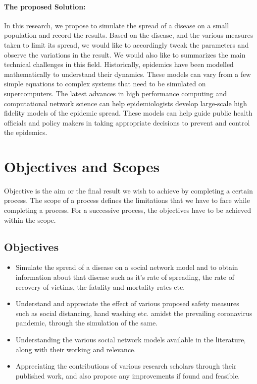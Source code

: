 \documentclass[14pt, a4paper]{extarticle}
\begin{document}
        \paragraph{The proposed Solution:} In this research, we propose to simulate the spread of a disease on a small population and record the results. Based on the disease, and the various measures taken to limit its spread, we would like to accordingly tweak the parameters and observe the variations in the result. We would also like to summarizes the main technical challenges in this field. Historically, epidemics have been modelled mathematically to understand their dynamics. These models can vary from a few simple equations to complex systems that need to be simulated on supercomputers. The latest advances in high performance computing and computational network science can help epidemiologists develop large-scale high fidelity models of the epidemic spread. These models can help guide public health officials and policy makers in taking appropriate decisions to prevent and control the epidemics.

	\newpage
	\section{Objectives and Scopes}
	    \paragraph{} Objective is the aim or the final result we wish to achieve by completing a certain process. The scope of a process defines the limitations that we have to face while completing a process. For a successive process, the objectives have to be achieved within the scope.
	    
	    \subsection{Objectives}
    	    \begin{itemize}
    	        \item Simulate the spread of a disease on a social network model and to obtain information about that disease such as it's rate of spreading, the rate of recovery of victims, the fatality and mortality rates etc.
    	        
    	        \item Understand and appreciate the effect of various proposed safety measures such as social distancing, hand washing etc. amidst the prevailing coronavirus pandemic, through the simulation of the same.
    	        
                \item Understanding the various social network models available in the literature, along with their working and relevance.
                
                \item Appreciating the contributions of various research scholars through their published work, and also propose any improvements if found and feasible.
    	    \end{itemize}
	    
\end{document}
